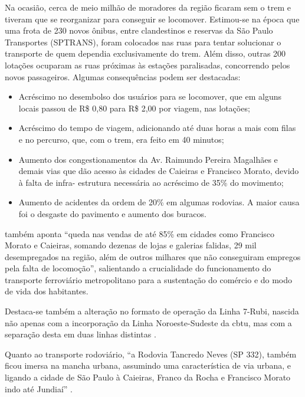     \begin{citacao}
    	Na ocasião, cerca de meio milhão de moradores da região ficaram sem o trem e tiveram que se reorganizar para conseguir se locomover. Estimou-se na época que uma frota de 230 novos ônibus, entre clandestinos e reservas da São Paulo Transportes (SPTRANS), foram colocados nas ruas para tentar solucionar o transporte de quem dependia exclusivamente do trem. Além disso, outras 200 lotações ocuparam as ruas próximas às estações paralisadas, concorrendo pelos novos passageiros. Algumas consequências podem ser destacadas:
    	
    	\begin{itemize}[leftmargin=\leftskip+-]
    		\item Acréscimo no desembolso dos usuários para se locomover, que em alguns locais
    	passou de R\$ 0,80 para R\$ 2,00 por viagem, nas lotações;
	    	\item Acréscimo do tempo de viagem, adicionando até duas horas a mais com filas e no
    	percurso, que, com o trem, era feito em 40 minutos;
	    	\item Aumento dos congestionamentos da Av. Raimundo Pereira Magalhães e demais vias
    	que dão acesso às cidades de Caieiras e Francisco Morato, devido à falta de infra-
    	estrutura necessária ao acréscimo de 35\% do movimento;
		    \item Aumento de acidentes da ordem de 20\% em algumas rodovias. A maior causa foi o
    	desgaste do pavimento e aumento dos buracos.
		\end{itemize}
    \end{citacao}
    
     também aponta ``queda nas vendas de até 85\% em cidades como Francisco Morato e Caieiras, somando dezenas de lojas e galerias falidas, 29 mil desempregados na região, além de outros milhares que não conseguiram empregos pela falta de locomoção'', salientando a crucialidade do funcionamento do transporte ferroviário metropolitano para a sustentação do comércio e do modo de vida dos habitantes.
    
    Destaca-se também a alteração no formato de operação da Linha 7-Rubi, nascida não apenas com a incorporação da Linha Noroeste-Sudeste da \gls{cbtu}, mas com a separação desta em duas linhas distintas \cite[p.50]{ferreira2010a} \cite[p.223]{stefani2007a}.
    
    Quanto ao transporte rodoviário, ``a Rodovia Tancredo Neves (SP 332), também ficou imersa na mancha urbana, assumindo uma característica de via urbana, e ligando a cidade de São Paulo à Caieiras, Franco da Rocha e Francisco Morato indo até Jundiaí'' \cite[p.49]{suarez2014a}.
    
